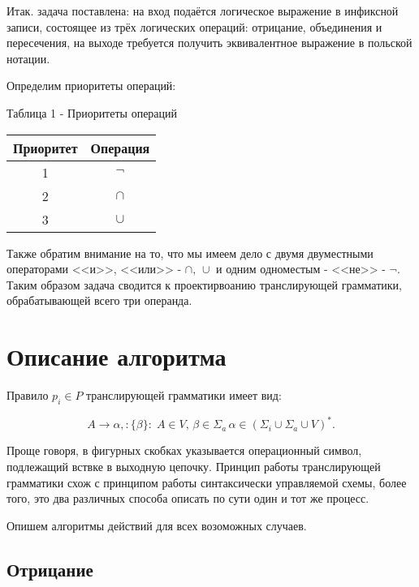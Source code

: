 \documentclass[12pt]{extarticle}
\begin{document}
\begin{sloppypar}
	Итак. задача поставлена: на вход подаётся логическое выражение в инфиксной записи, состоящее из трёх логических операций: отрицание, объединения и пересечения, на выходе требуется получить эквивалентное выражение в польской нотации.
	
	\par 
	
	Определим приоритеты операций: 
	
	\par
	
	\noindent Таблица 1 - Приоритеты операций
	
	
	\begin{center}	
		\begin{tabular}{| c | c |}
			\hline
			Приоритет & Операция \\
			\hline
			1 & $\neg$ \\
			\hline
			2 & $\cap$ \\
			\hline
			3 & $\cup$ \\
			\hline
		\end{tabular}
	\end{center}
	
	Также обратим внимание на то, что мы имеем дело с двумя двуместными операторами <<и>>, <<или>> - $\cap, \, \cup$ и одним одноместым - <<не>> - $\neg$. Таким образом задача сводится к проектирвоанию транслирующей грамматики, обрабатывающей всего три операнда.
	
	\section{Описание алгоритма}
	
	Правило $p_i \in P$ транслирующей грамматики имеет вид:
	
	\[
		A \rightarrow \alpha, : \{\beta\} : \; A \in V, \, \beta \in \Sigma_a \, \alpha \in (\Sigma_i \cup \Sigma_a \cup V)^*.
	\]
	
	Проще говоря, в фигурных скобках указывается операционный символ, подлежащий вствке в выходную цепочку. Принцип работы транслирующей грамматики схож с принципом работы синтаксически управляемой схемы, более того, это два различных способа описать по сути один и тот же процесс.
	
	Опишем алгоритмы действий для всех возоможных случаев.
	
	\subsection{Отрицание}
	

\end{sloppypar}
\end{document}
